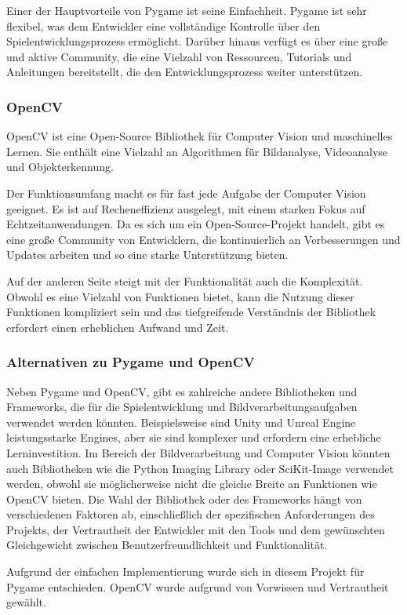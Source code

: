 Einer der Hauptvorteile von Pygame ist seine Einfachheit.
Pygame ist sehr flexibel, was dem Entwickler eine vollständige Kontrolle über den Spielentwicklungsprozess ermöglicht. 
Darüber hinaus verfügt es über eine große und aktive Community, die eine Vielzahl von Ressourcen, Tutorials und Anleitungen bereitstellt, 
die den Entwicklungsprozess weiter unterstützen.

\subsubsection{OpenCV}
OpenCV ist eine Open-Source Bibliothek für Computer Vision und maschinelles Lernen. 
Sie enthält eine Vielzahl an Algorithmen für Bildanalyse, Videoanalyse und Objekterkennung.

Der Funktionsumfang macht es für fast jede Aufgabe der Computer Vision geeignet. 
Es ist auf Recheneffizienz ausgelegt, mit einem starken Fokus auf Echtzeitanwendungen. 
Da es sich um ein Open-Source-Projekt handelt, gibt es eine große Community von Entwicklern, 
die kontinuierlich an Verbesserungen und Updates arbeiten und so eine starke Unterstützung bieten.

Auf der anderen Seite steigt mit der Funktionalität auch die Komplexität. Obwohl es eine Vielzahl von Funktionen bietet, 
kann die Nutzung dieser Funktionen kompliziert sein und das tiefgreifende Verständnis der Bibliothek erfordert einen erheblichen Aufwand und Zeit.

\subsubsection{Alternativen zu Pygame und OpenCV}
Neben Pygame und OpenCV, gibt es zahlreiche andere Bibliotheken und Frameworks, die für die Spielentwicklung und 
Bildverarbeitungsaufgaben verwendet werden könnten. Beispielsweise sind Unity und Unreal Engine leistungsstarke Engines, 
aber sie sind komplexer und erfordern eine erhebliche Lerninvestition. 
Im Bereich der Bildverarbeitung und Computer Vision könnten auch Bibliotheken wie die Python Imaging Library oder SciKit-Image verwendet werden, 
obwohl sie möglicherweise nicht die gleiche Breite an Funktionen wie OpenCV bieten.
Die Wahl der Bibliothek oder des Frameworks hängt von verschiedenen Faktoren ab, einschließlich der spezifischen Anforderungen des Projekts, 
der Vertrautheit der Entwickler mit den Tools und dem gewünschten Gleichgewicht zwischen Benutzerfreundlichkeit und Funktionalität.

Aufgrund der einfachen Implementierung wurde sich in diesem Projekt für Pygame entschieden. OpenCV wurde aufgrund von Vorwissen und Vertrautheit gewählt.

